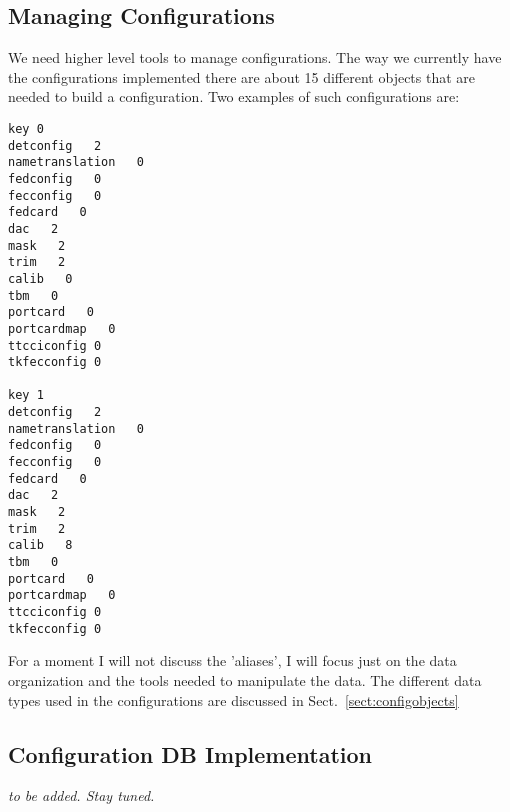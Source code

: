 \subsection{Managing Configurations}

We need higher level tools to manage configurations. The way we 
currently have the configurations implemented there are about 
15 different objects that are needed to build a configuration.
Two examples of such configurations are:

\begin{verbatim}
key 0
detconfig   2
nametranslation   0
fedconfig   0
fecconfig   0
fedcard   0
dac   2
mask   2
trim   2
calib   0
tbm   0
portcard   0
portcardmap   0
ttcciconfig 0
tkfecconfig 0

key 1
detconfig   2
nametranslation   0
fedconfig   0
fecconfig   0
fedcard   0
dac   2
mask   2
trim   2
calib   8
tbm   0
portcard   0
portcardmap   0
ttcciconfig 0
tkfecconfig 0
\end{verbatim}

For a moment I will not discuss the 'aliases', I will focus just
on the data organization and the tools needed to manipulate the
data. The different data types used in the configurations are 
discussed in Sect.~\ref{sect:configobjects}


\subsection{Configuration DB Implementation}

{\it to be added. Stay tuned.}


